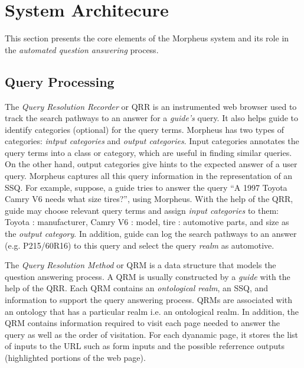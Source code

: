 \section{System Architecure}
\label{sec:systemarch}

This section presents the core elements of the Morpheus system and its 
role in the \textit{automated question answering} process. 

\subsection{Query Processing}
\label{sec:query_processing}
  
The \emph{Query Resolution Recorder} or QRR is an instrumented web browser
used to track the search pathways to an answer for a \textit{guide's} query. It
also helps guide to identify categories (optional) for the query terms. 
Morpheus has two types of categories: \emph{intput categories} and \emph{output categories}.
Input categories annotates the query terms into a class or category, which are 
useful in finding similar queries. On the other hand, output categories give hints
to the expected answer of a user query. Morpheus captures all
this query information in the representation of an SSQ. For example, suppose, a guide 
tries to answer the query ``A 1997 Toyota Camry V6 needs what size tires?'', using
Morpheus. With the help of the QRR, guide may choose relevant query terms and assign
\emph{input categories} to them: Toyota : manufacturer, Camry V6 : 
model, tire : automotive parts, and size as the \emph{output category}. 
In addition, guide can log the search pathways to an answer (e.g. P215/60R16)
to this query and select the query \emph{realm} as automotive.      


The \emph{Query Resolution Method} or QRM is a data structure that models the
question answering process. A QRM is usually constructed by a \emph{guide} with
the help of the QRR. Each QRM contains an \emph{ontological realm}, an SSQ, and
information to support the query answering process. QRMs are associated with an
ontology that has a particular realm i.e. an ontological realm. In addition, 
the QRM contains information required to visit each page needed to 
answer the query as well as the order of visitation. For each
dyanamic page, it stores the list of inputs to the URL such as form inputs and
the possible referrence outputs (highlighted portions of the web page).



